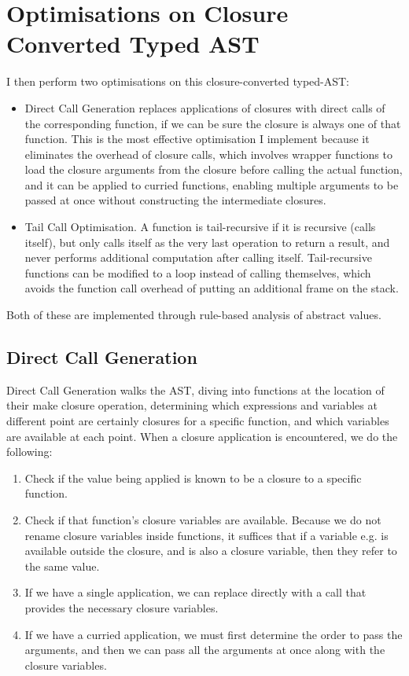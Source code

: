 \section{Optimisations on Closure Converted Typed AST}
I then perform two optimisations on this closure-converted typed-AST:
\begin{itemize}
\item Direct Call Generation replaces applications of closures with direct calls of the corresponding function, if we can be sure the closure is always one of that function. This is the most effective optimisation I implement because it eliminates the overhead of closure calls, which involves wrapper functions to load the closure arguments from the closure before calling the actual function, and it can be applied to curried functions, enabling multiple arguments to be passed at once without constructing the intermediate closures.
\item Tail Call Optimisation. A function is tail-recursive if it is recursive (calls itself), but only calls itself as the very last operation to return a result, and never performs additional computation after calling itself. Tail-recursive functions can be modified to a loop instead of calling themselves, which avoids the function call overhead of putting an additional frame on the stack.
\end{itemize}
Both of these are implemented through rule-based analysis of abstract values.

\subsection{Direct Call Generation}
Direct Call Generation walks the AST, diving into functions at the location of their make closure operation, determining which expressions and variables at different point are certainly closures for a specific function, and which variables are available at each point. When a closure application is encountered, we do the following:
\begin{enumerate}
\item Check if the value being applied is known to be a closure to a specific function.
\item Check if that function's closure variables are available. Because we do not rename closure variables inside functions, it suffices that if a variable e.g.  is available outside the closure, and is also a closure variable, then they refer to the same value.
\item If we have a single application, we can replace directly with a call that provides the necessary closure variables.
\item If we have a curried application, we must first determine the order to pass the arguments, and then we can pass all the arguments at once along with the closure variables.
\end{enumerate}

